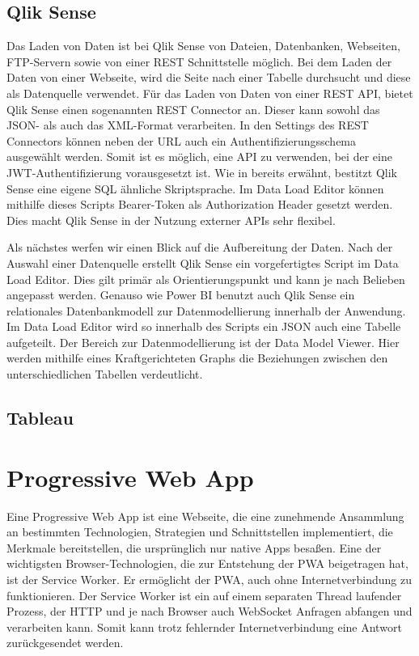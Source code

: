 \subsection{Qlik Sense}
\label{subsec:qliksense}
Das Laden von Daten ist bei Qlik Sense von Dateien, Datenbanken, Webseiten, FTP-Servern sowie von einer
REST Schnittstelle möglich. Bei dem Laden der Daten von einer Webseite, wird die Seite nach einer Tabelle
durchsucht und diese als Datenquelle verwendet.\cite[S. 17]{QlikSenseCookbook} Für das Laden von Daten von
einer REST API, bietet Qlik Sense einen sogenannten REST Connector an. Dieser kann sowohl das JSON- als auch
das XML-Format verarbeiten. In den Settings des REST Connectors können neben der URL auch ein
Authentifizierungsschema ausgewählt werden.\cite[S. 23]{QlikSenseCookbook} Somit ist es möglich,
eine API zu verwenden, bei der eine JWT-Authentifizierung vorausgesetzt ist. Wie in 
bereits erwähnt, bestitzt Qlik Sense eine eigene SQL ähnliche Skriptsprache. Im Data Load Editor
können mithilfe dieses Scripts Bearer-Token als Authorization Header gesetzt werden. Dies macht Qlik
Sense in der Nutzung externer APIs sehr flexibel.

Als nächstes werfen wir einen Blick auf die Aufbereitung der Daten. Nach der Auswahl einer Datenquelle
erstellt Qlik Sense ein vorgefertigtes Script im Data Load Editor. Dies gilt primär als Orientierungspunkt
und kann je nach Belieben angepasst werden. Genauso wie Power BI benutzt auch Qlik Sense ein relationales
Datenbankmodell zur Datenmodellierung innerhalb der Anwendung. Im Data Load Editor wird so innerhalb des
Scripts ein JSON auch eine Tabelle aufgeteilt. Der Bereich zur Datenmodellierung ist der Data Model Viewer.
Hier werden mithilfe eines Kraftgerichteten Graphs die Beziehungen zwischen den unterschiedlichen
Tabellen verdeutlicht. 

\subsection{Tableau}
\label{subsec:tableau}



\section{Progressive Web App}
\label{sec:progressivewebapp}
Eine Progressive Web App ist eine Webseite, die eine zunehmende Ansammlung an bestimmten Technologien,
Strategien und Schnittstellen implementiert, die Merkmale bereitstellen, die ursprünglich nur
native Apps besaßen.\cite{WikiPWA} Eine der wichtigsten Browser-Technologien, die zur Entstehung der PWA beigetragen hat,
ist der Service Worker. Er ermöglicht der PWA, auch ohne Internetverbindung zu funktionieren. Der 
Service Worker ist ein auf einem separaten Thread laufender Prozess, der HTTP und je nach Browser
auch WebSocket Anfragen abfangen und verarbeiten kann. Somit kann trotz fehlernder Internetverbindung
eine Antwort zurückgesendet werden. \cite{W3ServiceWorker}

